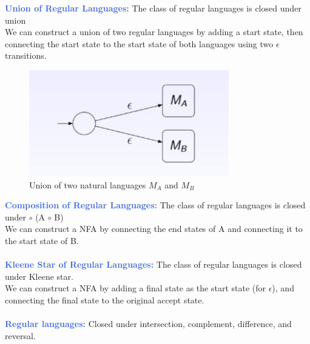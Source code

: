 \documentclass[a4paper,10pt]{article}
\begin{document}
\textcolor{RoyalBlue}{\textbf{Union of Regular Languages:}} The class of regular languages is closed under union\\
We can construct a union of two regular languages by adding a start state, then connecting the start state to the start state of both  languages using two $\epsilon$ transitions.
\begin{figure}[htbp]
\centerline{ \includegraphics[scale = 0.7]{langunion}}
\caption{Union of two natural languages $M_{A}$ and $M_{B}$}
\label{fig}
\end{figure}
\newpage
\noindent \textcolor{RoyalBlue}{\textbf{Composition of Regular Languages:}} The class of regular languages is closed under $\circ$ (A $\circ$ B)\\
We can construct a NFA by connecting the end states of A and connecting it to the start state of B.  \\\\
\textcolor{RoyalBlue}{\textbf{Kleene Star of Regular Languages:}} The class of regular languages is closed under Kleene star. \\
We can construct a NFA by adding a final state as the start state (for $\epsilon$), and connecting the final state to the original accept state.  \\\\
\noindent \textcolor{RoyalBlue}{\textbf{Regular languages:}} Closed under intersection, complement, difference, and reversal. \\\\
\end{document}
